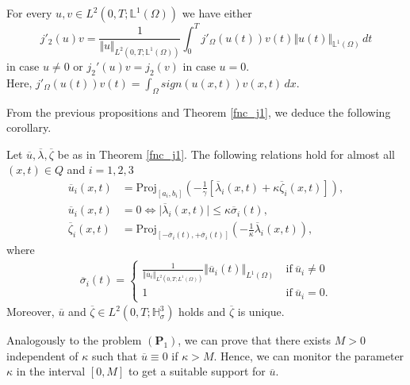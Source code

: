 \documentclass[reqno]{amsart}
\begin{document}
	\begin{proposition}
		For every $u,v\in L^2(0,T;\mathbb{L}^1(\Omega))$ we have either
		\begin{equation} \label{j2_3}
			j'_2(u)v= \frac{1}{\Vert u \Vert_{L^2(0,T;\mathbb{L}^1(\Omega))}} \int_0^T j'_\Omega(u(t))v(t) \Vert u(t) \Vert_{\mathbb{L}^1(\Omega)} \,dt
		\end{equation}
		in case  $u\neq 0$ or $j_2'(u)v=j_2(v)$ in case $u=0$. \\
		Here, $\displaystyle j'_\Omega(u(t))v(t)=\int_\Omega sign (u(x,t)) v(x,t) \, dx.$
	\end{proposition}
	From the previous propositions and Theorem \ref{fnc_j1}, we deduce the following corollary.
	\begin{corollary}
		Let $\overline{u}, \overline{\lambda}, \overline{\zeta}$ be as in Theorem \ref{fnc_j1}. The following relations hold for almost all $(x,t)\in Q$ and $i=1,2,3$
		\begin{align}
			\overline{u}_i(x,t)&=\text{Proj}_{[a_i,b_i]} \left( -\frac{1}{\gamma} \left[ \overline{\lambda}_i(x,t) + \kappa \overline{\zeta}_i(x,t) \right] \right), \label{j2_4} \\
			\overline{u}_i(x,t) &= 0 \Leftrightarrow \vert \overline{\lambda}_i(x,t) \vert \leq \kappa \overline{\sigma}_i(t), \label{j2_5} \\
			\overline{\zeta}_i(x,t) &= \text{Proj}_{[-\overline{\sigma}_i(t), +\overline{\sigma}_i(t)]} \left( -\frac{1}{\kappa} \overline{\lambda}_i(x,t) \right), \label{j2_6}
		\end{align}
		where
		\begin{align*}
			\overline{\sigma}_i(t)=\begin{cases}
				\frac{1}{\Vert \overline{u}_i \Vert_{L^2(0,T;L^1(\Omega))}} \Vert \overline{u}_i(t) \Vert_{L^1(\Omega)} \ &\text{if} \ \overline{u}_i\neq 0 \\
				1 \ &\text{if} \ \overline{u}_i = 0.
			\end{cases}
		\end{align*}
		Moreover, $\overline{u}$ and $\overline{\zeta}\in L^2(0,T;\mathbb{H}^3_\sigma)$ holds and $\overline{\zeta}$ is unique. 
	\end{corollary}
	
	Analogously to the problem $(\textbf{P}_1)$, we can prove that there exists $M>0$ independent of $\kappa$ such that $\overline{u} \equiv 0$ if $\kappa>M$. Hence, we can monitor the parameter $\kappa$ in the interval $[0,M]$ to get a suitable support for $\overline{u}$.
	
\end{document}
